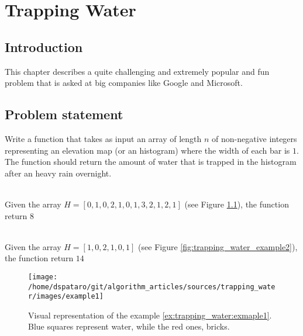 %

\chapter{Trapping Water}
\label{ch:trapping_water}
\section*{Introduction}
This chapter describes a quite challenging and extremely popular and fun problem that is asked at big companies like Google and Microsoft. 


\section{Problem statement}
\begin{exercise}
Write a function that takes as input an array of length $n$ of non-negative integers representing an elevation map (or an histogram) where the width of each bar is $1$. The function should return the amount of water that is trapped in the histogram after an heavy rain overnight. 

	\begin{example}
		\label{ex:trapping_water:exmaple1}
		\hfill \\
		Given the array $H=[0,1,0,2,1,0,1,3,2,1,2,1]$ (see Figure \ref{fig:trapping_water_example1}), the function return $8$
	\end{example}

	\begin{example}
		\label{ex:trapping_water:exmaple2}
		\hfill \\
		Given the array $H=[1,0,2,1,0,1]$ (see Figure \ref{fig:trapping_water_example2}), the function return $14$
	\end{example}

\end{exercise}

\begin{figure}
		\label{fig:trapping_water_example1}
		\centering
		\texttt{[image: /home/dspataro/git/algorithm\_articles/sources/trapping\_water/images/example1]}
		\caption{Visual representation of the example \ref{ex:trapping_water:exmaple1}. Blue squares represent water, while the red ones, bricks.}
\end{figure}



